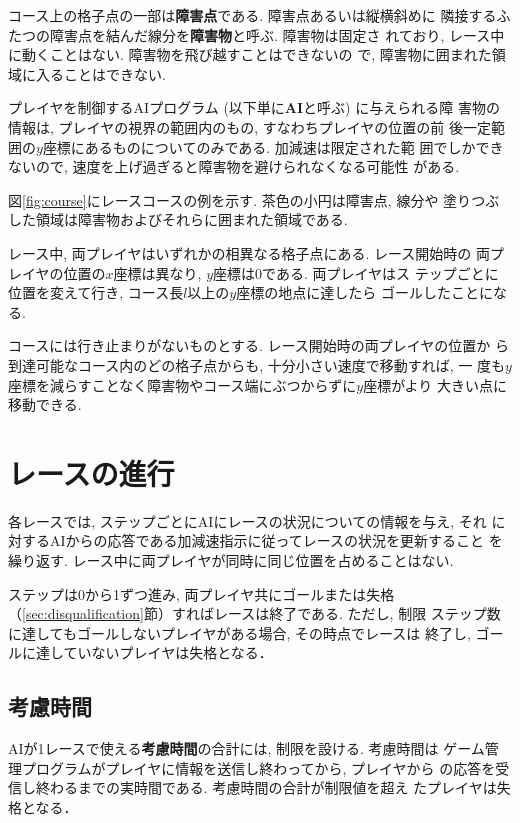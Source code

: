 \documentclass[11pt]{jarticle}
\newcommand\secref[1]{\mbox{\ref{#1}節}}
\begin{document}
コース上の格子点の一部は{\bf 障害点}である.  障害点あるいは縦横斜めに
隣接するふたつの障害点を結んだ線分を{\bf 障害物}と呼ぶ. 障害物は固定さ
れており, レース中に動くことはない.  障害物を飛び越すことはできないの
で, 障害物に囲まれた領域に入ることはできない.

プレイヤを制御するAIプログラム (以下単に{\bf AI}と呼ぶ) に与えられる障
害物の情報は, プレイヤの視界の範囲内のもの, すなわちプレイヤの位置の前
後一定範囲の$y$座標にあるものについてのみである. 加減速は限定された範
囲でしかできないので, 速度を上げ過ぎると障害物を避けられなくなる可能性
がある.

図\ref{fig:course}にレースコースの例を示す. 茶色の小円は障害点, 線分や
塗りつぶした領域は障害物およびそれらに囲まれた領域である.

レース中, 両プレイヤはいずれかの相異なる格子点にある.  レース開始時の
両プレイヤの位置の$x$座標は異なり, $y$座標は$0$である.  両プレイヤはス
テップごとに位置を変えて行き, コース長$l$以上の$y$座標の地点に達したら
ゴールしたことになる.

コースには行き止まりがないものとする. レース開始時の両プレイヤの位置か
ら到達可能なコース内のどの格子点からも, 十分小さい速度で移動すれば, 一
度も$y$座標を減らすことなく障害物やコース端にぶつからずに$y$座標がより
大きい点に移動できる.

\section{レースの進行}\label{sec:race_process}
各レースでは, ステップごとにAIにレースの状況についての情報を与え, それ
に対するAIからの応答である加減速指示に従ってレースの状況を更新すること
を繰り返す.  レース中に両プレイヤが同時に同じ位置を占めることはない.

ステップは0から1ずつ進み, 両プレイヤ共にゴールまたは失格
（\secref{sec:disqualification}）すればレースは終了である. ただし, 制限
ステップ数に達してもゴールしないプレイヤがある場合, その時点でレースは
終了し, ゴールに達していないプレイヤは失格となる．

\subsection{考慮時間}\label{sec:consideration_time}
AIが1レースで使える{\bf 考慮時間}の合計には, 制限を設ける. 考慮時間は
ゲーム管理プログラムがプレイヤに情報を送信し終わってから, プレイヤから
の応答を受信し終わるまでの実時間である.  考慮時間の合計が制限値を超え
たプレイヤは失格となる．
\end{document}
